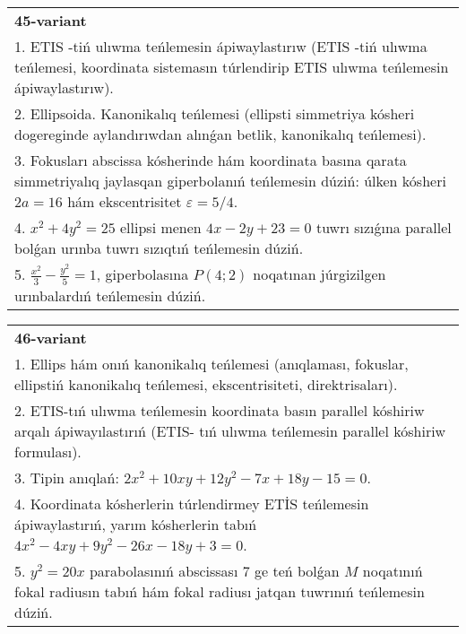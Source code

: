 \documentclass{article}
\begin{document}
\begin{tabular}{m{17cm}}
\textbf{45-variant}\\
1. ETIS -tiń ulıwma teńlemesin ápiwaylastırıw (ETIS -tiń ulıwma teńlemesi, koordinata sistemasın túrlendirip ETIS ulıwma teńlemesin ápiwaylastırıw).\\

2. Ellipsoida. Kanonikalıq teńlemesi (ellipsti simmetriya kósheri dogereginde aylandırıwdan alınǵan betlik, kanonikalıq teńlemesi).\\

3. Fokusları abscissa kósherinde hám koordinata basına qarata simmetriyalıq jaylasqan giperbolanıń teńlemesin dúziń: úlken kósheri $2 a=16$ hám ekscentrisitet $\varepsilon=5/4$.\\

4. $x^{2} + 4y^{2} = 25$ ellipsi menen $4x - 2y + 23 = 0$ tuwrı sızıǵına parallel bolǵan urınba tuwrı sızıqtıń teńlemesin dúziń.  \\

5. $\frac{x^{2}}{3} - \frac{y^{2}}{5} = 1$, giperbolasına $P(4;2)$ noqatınan júrgizilgen urınbalardıń teńlemesin dúziń.  
\end{tabular}
\vspace{1cm}


\begin{tabular}{m{17cm}}
\textbf{46-variant}\\
1. Ellips hám onıń kanonikalıq teńlemesi (anıqlaması, fokuslar, ellipstiń kanonikalıq teńlemesi, ekscentrisiteti, direktrisaları).\\

2. ETIS-tıń ulıwma teńlemesin koordinata basın parallel kóshiriw arqalı ápiwayılastırıń (ETIS- tıń ulıwma teńlemesin parallel kóshiriw formulası).\\

3. Tipin anıqlań: $2 x^{2}+10 xy+12 y^{2}-7 x+18 y-15=0$.\\

4. Koordinata kósherlerin túrlendirmey ETİS teńlemesin ápiwaylastırıń, yarım kósherlerin tabıń $4x^{2} - 4xy + 9y^{2} - 26x - 18y + 3 = 0$.\\

5. $y^{2} = 20x$ parabolasınıń abscissası 7 ge teń bolǵan $M$ noqatınıń fokal radiusın tabıń hám fokal radiusı jatqan tuwrınıń teńlemesin dúziń.  
\end{tabular}
\vspace{1cm}
\end{document}

